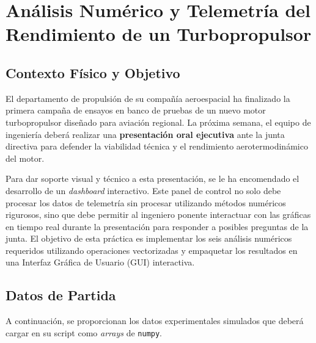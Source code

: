 

\section{Análisis Numérico y Telemetría del Rendimiento de un Turbopropulsor}

	
	\subsection*{Contexto Físico y Objetivo}
	
	El departamento de propulsión de su compañía aeroespacial ha finalizado la primera campaña de ensayos en banco de pruebas de un nuevo motor turbopropulsor diseñado para aviación regional. La próxima semana, el equipo de ingeniería deberá realizar una \textbf{presentación oral ejecutiva} ante la junta directiva para defender la viabilidad técnica y el rendimiento aerotermodinámico del motor.
	
	Para dar soporte visual y técnico a esta presentación, se le ha encomendado el desarrollo de un \textit{dashboard} interactivo. Este panel de control no solo debe procesar los datos de telemetría sin procesar utilizando métodos numéricos rigurosos, sino que debe permitir al ingeniero ponente interactuar con las gráficas en tiempo real durante la presentación para responder a posibles preguntas de la junta. El objetivo de esta práctica es implementar los seis análisis numéricos requeridos utilizando operaciones vectorizadas y empaquetar los resultados en una Interfaz Gráfica de Usuario (GUI) interactiva.
	
	\subsection*{Datos de Partida}
	
	A continuación, se proporcionan los datos experimentales simulados que deberá cargar en su script como \textit{arrays} de \texttt{numpy}.
	
